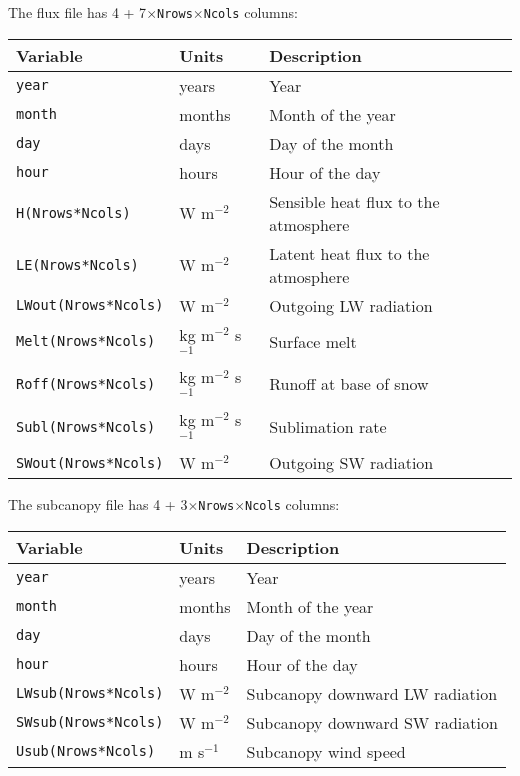 \documentclass{article}
\begin{document}
The flux file has 4 + 7$\times${\tt Nrows$\times$Ncols} columns:
\begin{longtable}{|l|l|l|} \hline
Variable                 & Units       & Description                          \\ \hline
{\tt year}               & years       & Year                                 \\
{\tt month}              & months      & Month of the year                    \\
{\tt day}                & days        & Day of the month                     \\
{\tt hour}               & hours       & Hour of the day                      \\
{\tt H(Nrows*Ncols)}     & W m$^{-2}$  & Sensible heat flux to the atmosphere \\
{\tt LE(Nrows*Ncols)}    & W m$^{-2}$  & Latent heat flux to the atmosphere   \\
{\tt LWout(Nrows*Ncols)} & W m$^{-2}$  & Outgoing LW radiation                \\
{\tt Melt(Nrows*Ncols)}  & kg m$^{-2}$ s$^{-1}$ & Surface melt                \\
{\tt Roff(Nrows*Ncols)}  & kg m$^{-2}$ s$^{-1}$ & Runoff at base of snow      \\
{\tt Subl(Nrows*Ncols)}  & kg m$^{-2}$ s$^{-1}$ & Sublimation rate            \\
{\tt SWout(Nrows*Ncols)} & W m$^{-2}$  & Outgoing SW radiation                \\ \hline 
\end{longtable}

The subcanopy file has 4 + 3$\times${\tt Nrows$\times$Ncols} columns:
\begin{longtable}{|l|l|l|} \hline
Variable                 & Units       & Description                          \\ \hline
{\tt year}               & years       & Year                                 \\
{\tt month}              & months      & Month of the year                    \\
{\tt day}                & days        & Day of the month                     \\
{\tt hour}               & hours       & Hour of the day                      \\
{\tt LWsub(Nrows*Ncols)} & W m$^{-2}$  & Subcanopy downward LW radiation      \\
{\tt SWsub(Nrows*Ncols)} & W m$^{-2}$  & Subcanopy downward SW radiation      \\
{\tt Usub(Nrows*Ncols)}  & m s$^{-1}$  & Subcanopy wind speed                 \\ \hline 
\end{longtable}
\end{document}
